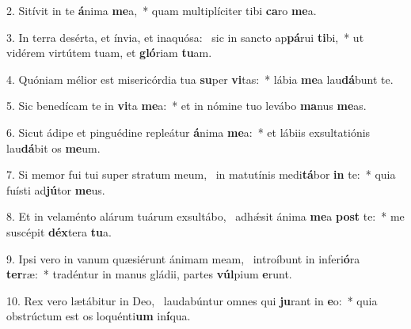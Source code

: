 2. Sitívit in te \textbf{á}nima \textbf{me}a,~*  quam multiplíciter tibi \textbf{ca}ro \textbf{me}a.\

3. In terra desérta, et ínvia, et inaquósa: \dag\  sic in sancto ap\textbf{pá}rui \textbf{ti}bi,~*  ut vidérem virtútem tuam, et \textbf{gló}riam \textbf{tu}am.\

4. Quóniam mélior est misericórdia tua \textbf{su}per \textbf{vi}tas:~*  lábia \textbf{me}a lau\textbf{dá}bunt te.\

5. Sic benedícam te in \textbf{vi}ta \textbf{me}a:~*  et in nómine tuo levábo \textbf{ma}nus \textbf{me}as.\

6. Sicut ádipe et pinguédine repleátur \textbf{á}nima \textbf{me}a:~*  et lábiis exsultatiónis lau\textbf{dá}bit os \textbf{me}um.\

7. Si memor fui tui super stratum meum, \dag\  in matutínis medi\textbf{tá}bor \textbf{in} te:~*  quia fuísti ad\textbf{jú}tor \textbf{me}us.\

8. Et in velaménto alárum tuárum exsultábo, \dag\  adhǽsit ánima \textbf{me}a \textbf{post} te:~*  me suscépit \textbf{déx}tera \textbf{tu}a.\

9. Ipsi vero in vanum quæsiérunt ánimam meam, \dag\  introíbunt in inferi\textbf{ó}ra \textbf{ter}ræ:~*  tradéntur in manus gládii, partes \textbf{vúl}pium \textbf{e}runt.\

10. Rex vero lætábitur in Deo, \dag\  laudabúntur omnes qui \textbf{ju}rant in \textbf{e}o:~*  quia obstrúctum est os loquénti\textbf{um} in\textbf{í}qua.\

